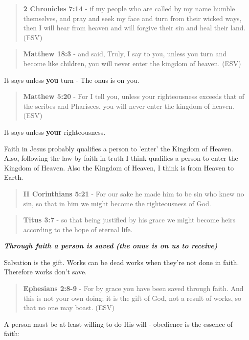 \documentclass[11pt]{article}
\begin{document}
\begin{quote}
\textbf{2 Chronicles 7:14} - if my people who are called by my name humble themselves, and pray and seek my face and turn from their wicked ways, then I will hear from heaven and will forgive their sin and heal their land. (ESV)
\end{quote}

\begin{quote}
\textbf{Matthew 18:3} - and said, Truly, I say to you, unless you turn and become like children, you will never enter the kingdom of heaven. (ESV)
\end{quote}

It says unless \textbf{you} turn - The onus is on you.

\begin{quote}
\textbf{Matthew 5:20} - For I tell you, unless your righteousness exceeds that of the scribes and Pharisees, you will never enter the kingdom of heaven. (ESV)
\end{quote}

It says unless \textbf{your} righteousness.

Faith in Jesus probably qualifies a person to 'enter' the Kingdom of Heaven.
Also, following the law by faith in truth I think qualifies a person to enter the Kingdom of Heaven.
Also the Kingdom of Heaven, I think is from Heaven to Earth.

\begin{quote}
\textbf{II Corinthians 5:21} - For our sake he made him to be sin who knew no sin, so that in him we might become the righteousness of God.
\end{quote}

\begin{quote}
\textbf{Titus 3:7} - so that being justified by his grace we might become heirs according to the hope of eternal life.
\end{quote}

\emph{\textbf{Through faith a person is saved (the onus is on us to receive)}}

Salvation is the gift. Works can be dead works when they're not done in faith. Therefore works don't save.

\begin{quote}
\textbf{Ephesians 2:8-9} - For by grace you have been saved through faith. And this is not your own doing; it is the gift of God, not a result of works, so that no one may boast. (ESV)
\end{quote}

A person must be at least willing to do His will - obedience is the essence of faith:
\end{document}
